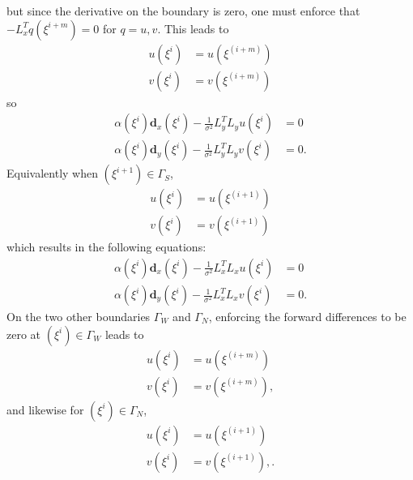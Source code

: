 but since the derivative on the boundary is zero, one must enforce that $-L_x^Tq(\xi^{i+m}) = 0$ for $q = u,v$. This leads to
\begin{align*}
u(\xi^i) &= u(\xi^{(i+m)})  \\
v(\xi^i) &= v(\xi^{(i+m)}) 
\end{align*}
 so
\begin{align*}
\alpha(\xi^i) \textbf{d}_x(\xi^i) - \frac{1}{\sigma^2} L_y^T L_y u(\xi^i) &= 0 \\
\alpha(\xi^i) \textbf{d}_y(\xi^i) - \frac{1}{\sigma^2} L_y^T L_y v(\xi^i)  &= 0.
\end{align*}
Equivalently when $(\xi^{i+1}) \in \Gamma_S$,
\begin{align*}
u(\xi^i) &= u(\xi^{(i+1)})  \\
v(\xi^i) &= v(\xi^{(i+1)}) 
\end{align*}
which results in the following equations:
\begin{align*}
\alpha(\xi^i) \textbf{d}_x(\xi^i) - \frac{1}{\sigma^2} L_x^T L_x u(\xi^i) &= 0 \\
\alpha(\xi^i) \textbf{d}_y(\xi^i) - \frac{1}{\sigma^2} L_x^T L_x v(\xi^i) &= 0.
\end{align*}
On the two other boundaries $\Gamma_W$ and $\Gamma_N$, enforcing the forward differences to be zero at $(\xi^i) \in \Gamma_W$ leads to
\begin{align*}
u(\xi^i) &= u(\xi^{(i+m)})  \\
v(\xi^i) &= v(\xi^{(i+m)}), 
\end{align*}
and likewise for $(\xi^i) \in \Gamma_N$,
\begin{align*}
u(\xi^i) &= u(\xi^{(i+1)})  \\
v(\xi^i) &= v(\xi^{(i+1)}),.
\end{align*}



